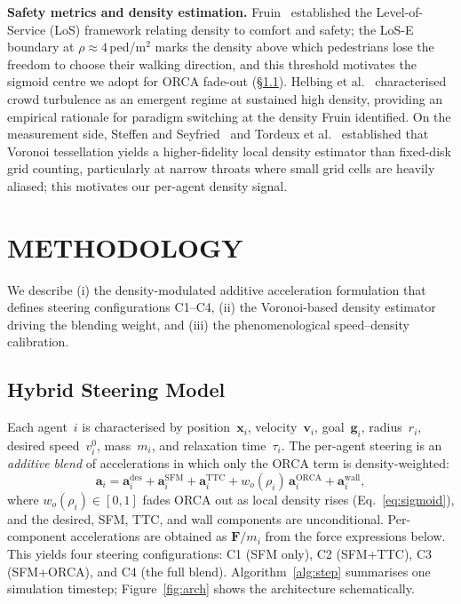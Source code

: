 \documentclass[a4paper,twoside]{article}
\begin{document}
\textbf{Safety metrics and density estimation.}
Fruin~\cite{Fruin71} established the Level-of-Service (LoS) framework relating density to comfort and safety; the LoS-E boundary at $\rho\!\approx\!4$\,ped/m$^2$ marks the density above which pedestrians lose the freedom to choose their walking direction, and this threshold motivates the sigmoid centre we adopt for ORCA fade-out (\S\ref{sec:hybrid}). Helbing et al.~\cite{Helbing07} characterised crowd turbulence as an emergent regime at sustained high density, providing an empirical rationale for paradigm switching at the density Fruin identified. On the measurement side, Steffen and Seyfried~\cite{Steffen10} and Tordeux et al.~\cite{Tordeux15} established that Voronoi tessellation yields a higher-fidelity local density estimator than fixed-disk grid counting, particularly at narrow throats where small grid cells are heavily aliased; this motivates our per-agent density signal.


\section{\uppercase{Methodology}}
\label{sec:framework}

We describe (i) the density-modulated additive acceleration formulation that defines steering configurations C1--C4, (ii) the Voronoi-based density estimator driving the blending weight, and (iii) the phenomenological speed--density calibration.

\subsection{Hybrid Steering Model}
\label{sec:hybrid}

Each agent~$i$ is characterised by position~$\mathbf{x}_i$, velocity~$\mathbf{v}_i$, goal~$\mathbf{g}_i$, radius~$r_i$, desired speed~$v_i^0$, mass~$m_i$, and relaxation time~$\tau_i$. The per-agent steering is an \emph{additive blend} of accelerations in which only the ORCA term is density-weighted:
\begin{equation}\label{eq:hybrid}
    \mathbf{a}_i = \mathbf{a}^{\mathrm{des}}_i + \mathbf{a}^{\mathrm{SFM}}_i + \mathbf{a}^{\mathrm{TTC}}_i + w_o(\rho_i)\,\mathbf{a}^{\mathrm{ORCA}}_i + \mathbf{a}^{\mathrm{wall}}_i,
\end{equation}
where $w_o(\rho_i)\!\in\![0,1]$ fades ORCA out as local density rises (Eq.~\ref{eq:sigmoid}), and the desired, SFM, TTC, and wall components are unconditional. Per-component accelerations are obtained as $\mathbf{F}/m_i$ from the force expressions below. This yields four steering configurations: C1 (SFM only), C2 (SFM+TTC), C3 (SFM+ORCA), and C4 (the full blend). Algorithm~\ref{alg:step} summarises one simulation timestep; Figure~\ref{fig:arch} shows the architecture schematically.
\end{document}
